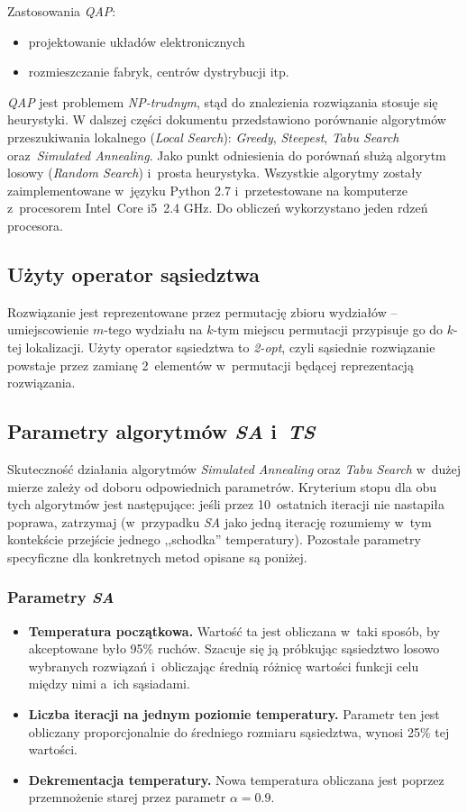 \documentclass{article}
\begin{document}
	Zastosowania \emph{QAP}:
	\begin{itemize}
		\item{projektowanie układów elektronicznych}
		\item{rozmieszczanie fabryk, centrów dystrybucji itp.}
	\end{itemize}
	
	\emph{QAP} jest problemem \emph{NP-trudnym}, stąd do znalezienia rozwiązania stosuje się heurystyki. W dalszej części dokumentu przedstawiono porównanie algorytmów przeszukiwania lokalnego (\emph{Local Search}): \emph{Greedy},  \emph{Steepest}, \emph{Tabu Search} oraz~\emph{Simulated Annealing}. Jako punkt odniesienia do porównań służą algorytm losowy (\emph{Random Search}) i~prosta heurystyka. Wszystkie algorytmy zostały zaimplementowane w~języku Python 2.7 i~przetestowane na komputerze z~procesorem Intel~Core i5~2.4 GHz. Do obliczeń wykorzystano jeden rdzeń procesora.

	\subsection{Użyty operator sąsiedztwa\label{ss:operator}}
	Rozwiązanie jest reprezentowane przez permutację zbioru wydziałów -- umiejscowienie $m$-tego wydziału na $k$-tym miejscu permutacji przypisuje go do $k$-tej lokalizacji.
	Użyty operator sąsiedztwa to \emph{2-opt}, czyli sąsiednie rozwiązanie powstaje przez zamianę 2~elementów w~permutacji będącej reprezentacją rozwiązania.

	\subsection{Parametry algorytmów \emph{SA} i~\emph{TS}}
	Skuteczność działania algorytmów \emph{Simulated Annealing} oraz \emph{Tabu Search} w~dużej mierze zależy od doboru odpowiednich parametrów. Kryterium stopu dla obu tych algorytmów jest następujące: jeśli przez 10~ostatnich iteracji nie nastapiła poprawa, zatrzymaj (w~przypadku \emph{SA} jako jedną iterację rozumiemy w~tym kontekście przejście jednego ,,schodka'' temperatury). Pozostałe parametry specyficzne dla konkretnych metod opisane są poniżej.
		\subsubsection{Parametry \emph{SA}}
			\begin{itemize}
			\item{\textbf{Temperatura początkowa.} Wartość ta jest obliczana w~taki sposób, by akceptowane było 95\% ruchów. Szacuje się ją próbkując sąsiedztwo losowo wybranych rozwiązań i~obliczając średnią różnicę wartości funkcji celu między nimi a~ich sąsiadami.}
			\item{\textbf{Liczba iteracji na jednym poziomie temperatury.} Parametr ten jest obliczany proporcjonalnie do średniego rozmiaru sąsiedztwa, wynosi 25\% tej wartości.}
			\item{\textbf{Dekrementacja temperatury.} Nowa temperatura obliczana jest poprzez przemnożenie starej przez parametr $\alpha=0.9$.}
			\end{itemize}
\end{document}
